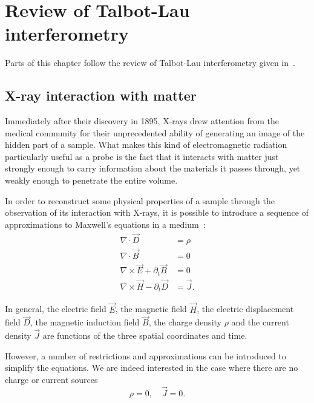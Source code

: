 \chapter{Review of Talbot-Lau interferometry}\label{ch:review}
Parts of this chapter follow the review of Talbot-Lau interferometry given
in~\parencite{galitesina}.

\section{X-ray interaction with matter}
Immediately after their discovery in 1895, X-rays drew attention from the
medical community for their unprecedented ability of generating an image of
the hidden part of a sample. What makes this kind of electromagnetic radiation
particularly useful as a probe is the fact that it interacts with matter
just strongly enough to carry information about the materials it passes
through, yet weakly enough to penetrate the entire volume.

In order to reconstruct some physical properties of a sample through the
observation of its interaction with X-rays, it is possible to introduce a
sequence of approximations to Maxwell's equations in a
medium~\parencite{jackson_classical_1999, Paganin2006b}:
\begin{align}
    \nabla \cdot \vec{D} &= \rho \label{eq:gauss-original}\\
    \nabla \cdot \vec{B} &= 0 \label{eq:nomonopoles-original}\\
    \nabla \times \vec{E} + \partial_t \vec{B} &= 0
    \label{eq:induction-original}\\
    \nabla \times \vec{H} - \partial_t \vec{D} &= \vec{J}
    \label{eq:ampere-original}.
\end{align}

In general, the electric field $\vec{E}$, the magnetic field $\vec{H}$, the
electric displacement field $\vec{D}$, the magnetic induction field
$\vec{B}$, the charge density $\rho$ and the current density $\vec{J}$ are
functions of the three spatial coordinates and time. 

However, a number of restrictions and approximations can be introduced to
simplify the equations. We are indeed interested in the case where there are
no charge or current sources
\begin{equation}
    \rho = 0, \quad \vec{J} = 0.
    \label{eq:absentsources}
\end{equation}

